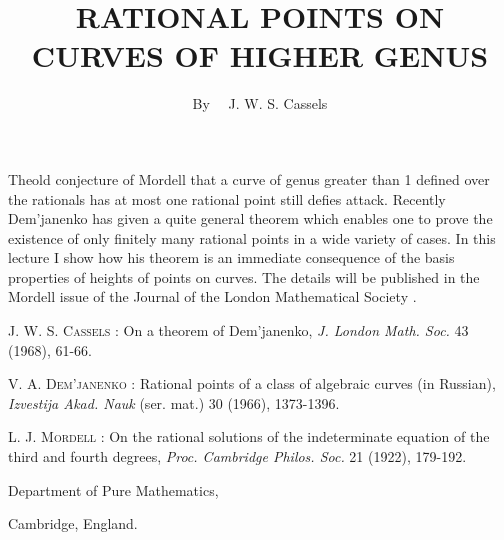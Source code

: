 \title{RATIONAL POINTS ON CURVES OF HIGHER GENUS}

\author{By~~ J. W. S. Cassels}

\date{}

\maketitle

\setcounter{pageoriginal}{82}
The\pageoriginale old conjecture of Mordell \cite{art06-key3} that a curve of genus greater than 1 defined over the rationals has at most one rational point still defies attack. Recently Dem'janenko \cite{art06-key2} has given a quite general theorem which enables one to prove the existence of only finitely many rational points in a wide variety of cases. In this lecture I show how his theorem is an immediate consequence of the basis properties of heights of points on curves. The details will be published in the Mordell issue of the Journal of the London Mathematical Society \cite{art06-key1}.

\begin{thebibliography}{99}
 \textsc{J. W. S. Cassels :} On a theorem of Dem'janenko, {\em J. London Math. Soc.} 43 (1968), 61-66.

 \textsc{V. A. Dem'janenko :} Rational points of a class of algebraic curves (in Russian), {\em Izvestija Akad. Nauk} (ser. mat.) 30 (1966), 1373-1396.

 \textsc{L. J. Mordell :} On the rational solutions of the indeterminate equation of the third and fourth degrees, {\em Proc. Cambridge Philos. Soc.} 21 (1922), 179-192.
\end{thebibliography}

\medskip
\noindent
{\small Department of Pure Mathematics,}

\noindent
{\small Cambridge, England.}

